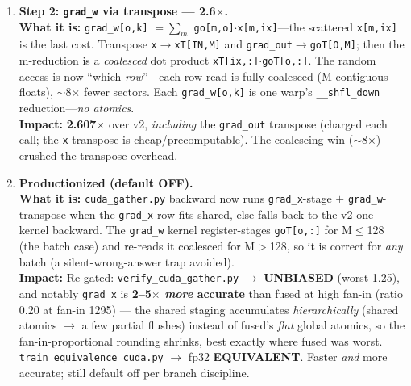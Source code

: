 \documentclass[11pt]{article}
\newcommand{\what}[1]{\textbf{What it is:} #1}
\newcommand{\impact}[1]{\textbf{Impact:} #1}
\begin{document}
\begin{enumerate}[leftmargin=*, resume]
\item \textbf{Step 2: \texttt{grad\_w} via transpose --- 2.6$\times$.}\\
\what{\texttt{grad\_w[o,k]} $= \sum_m$ \texttt{go[m,o]$\cdot$x[m,ix]}---the scattered
\texttt{x[m,ix]} is the last cost. Transpose \texttt{x}$\to$\texttt{xT[IN,M]} and
\texttt{grad\_out}$\to$\texttt{goT[O,M]}; then the m-reduction is a \emph{coalesced} dot product
\texttt{xT[ix,:]$\cdot$goT[o,:]}. The random access is now ``which \emph{row}''---each row read is
fully coalesced (M contiguous floats), $\sim$8$\times$ fewer sectors. Each \texttt{grad\_w[o,k]} is
one warp's \texttt{\_\_shfl\_down} reduction---\emph{no atomics}.}\\
\impact{\textbf{2.607$\times$} over v2, \emph{including} the \texttt{grad\_out} transpose (charged
each call; the \texttt{x} transpose is cheap/precomputable). The coalescing win ($\sim$8$\times$)
crushed the transpose overhead.}

\item \textbf{Productionized (default OFF).}\\
\what{\texttt{cuda\_gather.py} backward now runs \texttt{grad\_x}-stage $+$ \texttt{grad\_w}-transpose
when the \texttt{grad\_x} row fits shared, else falls back to the v2 one-kernel backward. The
\texttt{grad\_w} kernel register-stages \texttt{goT[o,:]} for M$\le$128 (the batch case) and
re-reads it coalesced for M$>$128, so it is correct for \emph{any} batch (a silent-wrong-answer trap
avoided).}\\
\impact{Re-gated: \texttt{verify\_cuda\_gather.py} $\to$ \textbf{UNBIASED} (worst 1.25), and
notably \texttt{grad\_x} is \textbf{2--5$\times$ \emph{more} accurate} than fused at high fan-in
(ratio 0.20 at fan-in 1295) --- the shared staging accumulates \emph{hierarchically} (shared
atomics $\to$ a few partial flushes) instead of fused's \emph{flat} global atomics, so the
fan-in-proportional rounding shrinks, best exactly where fused was worst.
\texttt{train\_equivalence\_cuda.py} $\to$ fp32 \textbf{EQUIVALENT}. Faster \emph{and} more
accurate; still default off per branch discipline.}

\end{enumerate}
\end{document}
